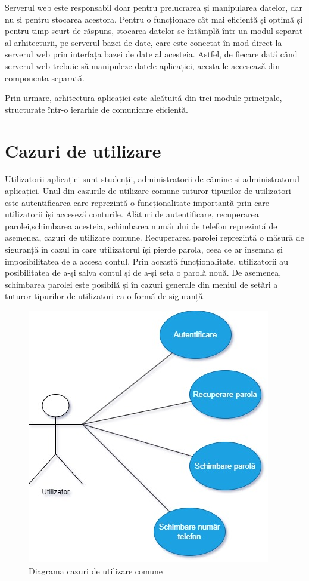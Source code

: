 \documentclass[12pt,a4paper]{report}
\theoremstyle{definition}
\theoremstyle{remark}
\begin{document}
\par Serverul web este responsabil doar pentru prelucrarea și manipularea datelor, dar nu și pentru stocarea acestora. Pentru o funcționare cât mai eficientă și optimă și pentru timp scurt de răspuns, stocarea datelor se întâmplă într-un modul separat al arhitecturii, pe serverul bazei de date, care este conectat în mod direct la serverul web prin interfața bazei de date al acesteia. Astfel, de fiecare dată când serverul web trebuie să manipuleze datele aplicației, acesta le accesează  din componenta separată.

\par Prin urmare, arhitectura aplicației este alcătuită din trei module principale, structurate într-o ierarhie de comunicare eficientă.

\section{Cazuri de utilizare}
\par Utilizatorii aplicației sunt studenții, administratorii de cămine și administratorul aplicației. Unul din cazurile de utilizare comune tuturor tipurilor de utilizatori este autentificarea care reprezintă o funcționalitate importantă prin care utilizatorii își acceseză conturile. Alături de autentificare, recuperarea parolei,schimbarea acesteia, schimbarea numărului de telefon reprezintă de asemenea, cazuri de utilizare comune. Recuperarea parolei reprezintă o măsură de siguranță în cazul în care utilizatorul își pierde parola, ceea ce ar însemna și imposibilitatea de a accesa contul. Prin această funcționalitate, utilizatorii au posibilitatea de a-și salva contul și de a-și seta o parolă nouă. De asemenea, schimbarea parolei este posibilă și în cazuri generale din meniul de setări a tuturor tipurilor de utilizatori ca o formă de siguranță.

\begin{figure}[H]
    \centering
    \includegraphics[width=0.5\linewidth, height=0.3\textheight]{resurse/diagrame/UVTDorms_UseCase_Student.jpg}
    \caption{Diagrama cazuri de utilizare comune}
\end{figure}
\end{document}
